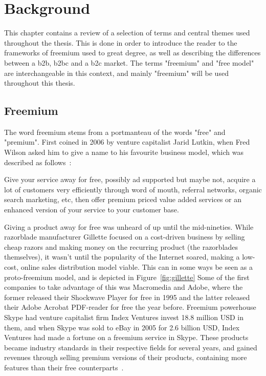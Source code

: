 \chapter{Background}
This chapter contains a review of a selection of terms and central themes used throughout the thesis. This is done in order to introduce the reader to the frameworks of freemium used to great degree, as well as describing the differences between a \gls{b2b}, \gls{b2bc} and a \gls{b2c} market. The terms "freemium" and "free model" are interchangeable in this context, and mainly "freemium" will be used throughout this thesis.
\section{Freemium}
The word freemium stems from a portmanteau of the words "free" and "premium". First coined in 2006 by venture capitalist Jarid Lutkin, when Fred Wilson asked him to give a name to his favourite business model, which was described as follows~\cite{fredwilson2006}:
\begin{displayquote}
Give your service away for free, possibly ad supported but maybe not,
acquire a lot of customers very efficiently through word of mouth,
referral networks, organic search marketing, etc, then offer premium
priced value added services or an enhanced version of your service to
your customer base.
\end{displayquote}

Giving a product away for free was unheard of up until the mid-nineties. While razorblade manufacturer Gillette focused on a cost-driven business by selling cheap razors and making money on the recurring product (the razorblades themselves), it wasn't until the popularity of the Internet soared, making a low-cost, online sales distribution model viable. This can in some ways be seen as a proto-freemium model, and is depicted in Figure~\ref{fig:gillette} Some of the first companies to take advantage of this was Macromedia and Adobe, where the former released their Shockwave Player for free in 1995 and the latter released their Adobe Acrobat PDF-reader for free the year before. Freemium powerhouse Skype had venture capitalist firm Index Ventures invest 18.8 million USD in them, and when Skype was sold to eBay in 2005 for 2.6 billion USD, Index Ventures had made a fortune on a freemium service in Skype.  These products became industry standards in their respective fields for several years, and gained revenues through selling premium versions of their products, containing more features than their free counterparts~\cite{katherineheires2007}. 

